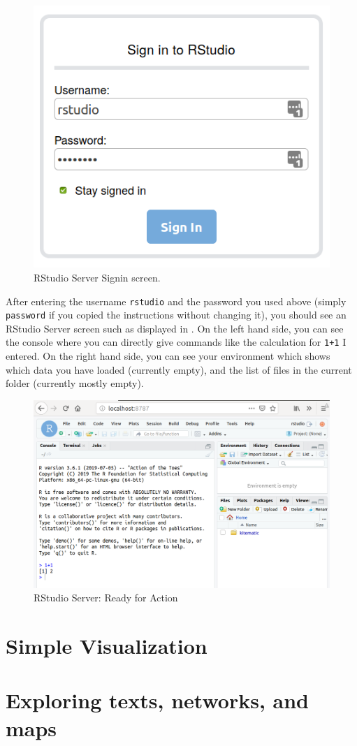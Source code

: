 \begin{figure}
\centering
\includegraphics[width=0.4\linewidth]{figures/ch02_rstudio_signin.png}
\caption{RStudio Server Signin screen.}
\label{fig:fun.rstudio.signin}
\end{figure}

After entering the username \texttt{rstudio} and the password you used above (simply \texttt{password} if you copied the instructions without changing it),
you should see an RStudio Server screen such as displayed in .
On the left hand side, you can see the console where you can directly give commands like the calculation for \texttt{1+1} I entered.
On the right hand side, you can see your environment which shows which data you have loaded (currently empty), and the list of files in the current folder
(currently mostly empty). 

\begin{figure}
\centering
\includegraphics[width=0.7\linewidth]{figures/ch02_rstudio.png}
\caption{RStudio Server: Ready for Action}
\label{fig:fun.rstudio}
\end{figure}

\section{Simple Visualization} \label{sec:fun.simple}

\section{Exploring texts, networks, and maps}
